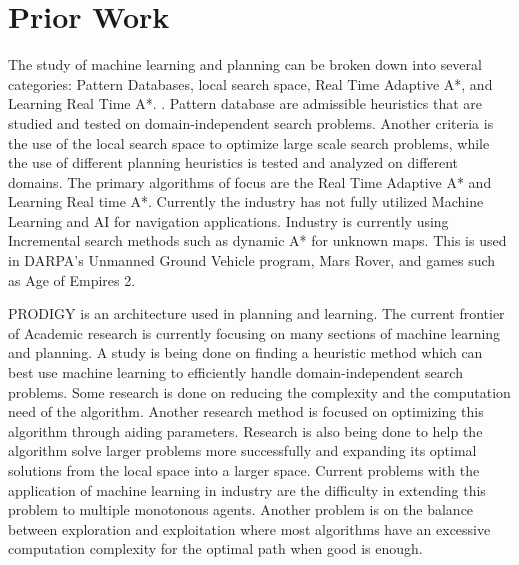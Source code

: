 \documentclass[tog]{acmsiggraph}
\begin{document}
\section{Prior Work}
The study of machine learning and planning can be broken down into several categories: Pattern Databases, local search space, Real Time Adaptive A*, and Learning Real Time A*. . Pattern database are admissible heuristics that are studied and tested on domain-independent search problems. Another criteria is the use of the local search space to optimize large scale search problems, while the use of different planning heuristics is tested and analyzed on different domains.\cite{haslum2007domain} The primary algorithms of focus are the Real Time Adaptive A* and Learning Real time A*. Currently the industry has not fully utilized Machine Learning and AI for navigation applications. Industry is currently using Incremental search methods such as dynamic A* for unknown maps. This is used in DARPA’s Unmanned Ground Vehicle program, Mars Rover, and games such as Age of Empires 2. 

PRODIGY is an architecture used in planning and learning.\cite{stone1994need} The current frontier of Academic research is currently focusing on many sections of machine learning and planning. A study is being done on finding a heuristic method which can best use machine learning to efficiently handle domain-independent search problems. Some research is done on reducing the complexity and the computation need of the algorithm. Another research method is focused on optimizing this algorithm through aiding parameters. Research is also being done to help the algorithm solve larger problems more successfully and expanding its optimal solutions from the local space into a larger space. Current problems with the application of machine learning in industry are the difficulty in extending this problem to multiple monotonous agents. Another problem is on the balance between exploration and exploitation where most algorithms have an excessive computation complexity for the optimal path when good is enough.
\end{document}
